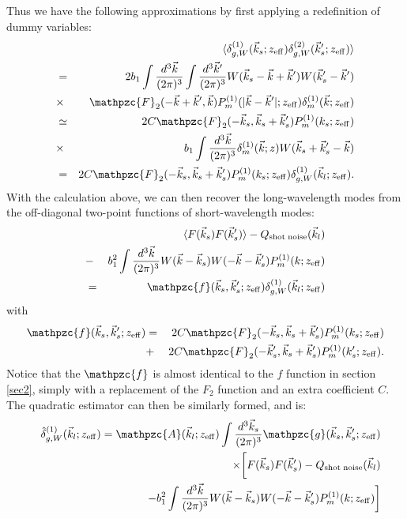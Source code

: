 \documentclass[prd,amsmath,amssymb,floatfix,superscriptaddress,nofootinbib,twocolumn]{revtex4-1}
\newcommand{\vs}{\nonumber\\}
\newcommand{\vk}{\vec{k}}
\newcommand{\eql}[1]{\label{eq:#1}}
\begin{document}
Thus we have the following approximations by first applying a redefinition of dummy variables:
\begin{eqnarray}
&&\langle \delta^{(1)}_{g,W}(\vec{k}_s;z_{\rm eff})\delta^{(2)}_{g,W}(\vec{k}'_s;z_{\rm eff})\rangle\nonumber\\
&=&2b_{1}\int \frac{d^{3}\vec{k}}{(2\pi)^3}\int \frac{d^{3}\vec{k}'}{(2\pi)^3}W(\vec{k}_s-\vec{k}+\vec{k}')W(\vec{k}'_s-\vec{k}')\nonumber\\
&\times &\mathpzc{F}_{2}(-\vec{k}+\vec{k}',\vec{k})P_{m}^{(1)}(|\vec{k}-\vec{k}'|;z_{\rm eff})\delta_{m}^{(1)}(\vec{k};z_{\rm eff})\nonumber\\
&\simeq&2C\mathpzc{F}_2(-\vec{k}_s,\vec{k}_s+\vec{k}'_s)P_{m}^{(1)}(k_s;z_{\rm eff})\nonumber\\
&\times & b_{1}\int \frac{d^{3}\vec{k}}{(2\pi)^3}\delta_{m}^{(1)}(\vec{k};z)W(\vec{k}_s+\vec{k}'_s-\vec{k})\nonumber\\
&=& 2C\mathpzc{F}_2(-\vec{k}_s,\vec{k}_s+\vec{k}'_s)P_{m}^{(1)}(k_s;z_{\rm eff})\delta^{(1)}_{g,W}(\vec{k}_l;z_{\rm eff}). \eql{extW}
\end{eqnarray}
With the calculation above, we can then recover the long-wavelength modes from the off-diagonal two-point functions of short-wavelength modes:
\begin{eqnarray}
&&\langle F(\vec{k}_s)F(\vec{k}'_s)\rangle-Q_{\rm shot \; noise}(\vk_l)\nonumber\\
&-&b_1^2\int \frac{d^{3}\vec{k}}{(2\pi)^3} W(\vec{k}-\vec{k}_s)W(-\vec{k}-\vec{k}'_s)P^{(1)}_{m}(k;z_{\rm eff})\nonumber\\
&=&\mathpzc{f}(\vec{k}_s,\vec{k}'_s;z_{\rm eff})\delta^{(1)}_{g,W}(\vec{k}_l;z_{\rm eff})
\end{eqnarray}
with
\begin{eqnarray}
\mathpzc{f}(\vec{k}_s,\vec{k}'_s;z_{\rm eff})&=&2C\mathpzc{F}_2(-\vec{k}_s,\vec{k}_s+\vec{k}'_s)P_{m}^{(1)}(k_s;z_{\rm eff})\nonumber \\
&+&2C\mathpzc{F}_2(-\vec{k}'_s,\vec{k}_s+\vec{k}'_s)P_{m}^{(1)}(k'_s;z_{\rm eff}).
\end{eqnarray}
Notice that the $\mathpzc{f}$ is almost identical to the $f$ function in section \ref{sec2}, simply with a replacement of the $F_2$ function and an extra coefficient $C$. The quadratic estimator can then be similarly formed, and is:
\begin{eqnarray}
&&\hat{\delta}^{(1)}_{g,W}(\vec{k}_l;z_{\rm eff})=\mathpzc{A}(\vec{k}_l;z_{\rm eff})\int \frac{d^{3}\vec{k}_s}{(2\pi)^3}\mathpzc{g}(\vec{k}_s,\vec{k}'_s;z_{\rm eff})\nonumber \\
&& \times \bigg[F(\vec{k}_s)F(\vec{k}'_s)-Q_{\rm shot \; noise}(\vk_l) \vs
&&- b_1^2\int \frac{d^{3}\vec{k}}{(2\pi)^3} W(\vec{k}-\vec{k}_s)W(-\vec{k}-\vec{k}'_s)P^{(1)}_{m}(k;z_{\rm eff})\bigg] \eql{qeLC}
\end{eqnarray}
\end{document}

